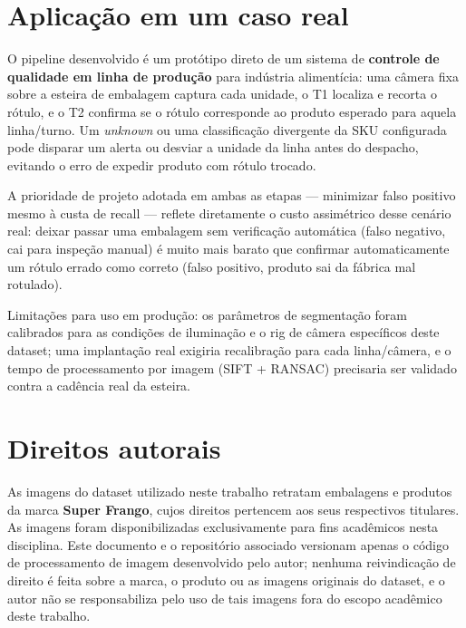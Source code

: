 \documentclass[a4paper,11pt]{article}
\begin{document}
\section{Aplicação em um caso real}

O pipeline desenvolvido é um protótipo direto de um sistema de \textbf{controle de qualidade em
linha de produção} para indústria alimentícia: uma câmera fixa sobre a esteira de embalagem
captura cada unidade, o T1 localiza e recorta o rótulo, e o T2 confirma se o rótulo corresponde
ao produto esperado para aquela linha/turno. Um \emph{unknown} ou uma classificação divergente
da SKU configurada pode disparar um alerta ou desviar a unidade da linha antes do
despacho, evitando o erro de expedir produto com rótulo trocado.

A prioridade de projeto adotada em ambas as etapas --- minimizar falso positivo mesmo à custa de
recall --- reflete diretamente o custo assimétrico desse cenário real: deixar passar uma
embalagem sem verificação automática (falso negativo, cai para inspeção manual) é muito mais
barato que confirmar automaticamente um rótulo errado como correto (falso positivo, produto
sai da fábrica mal rotulado).

Limitações para uso em produção: os parâmetros de segmentação foram calibrados para as condições
de iluminação e o rig de câmera específicos deste dataset; uma implantação real exigiria
recalibração para cada linha/câmera, e o tempo de processamento por imagem (SIFT + RANSAC) precisaria
ser validado contra a cadência real da esteira.

\section{Direitos autorais}

As imagens do dataset utilizado neste trabalho retratam embalagens e produtos da marca
\textbf{Super Frango}, cujos direitos pertencem aos seus respectivos titulares. As imagens foram
disponibilizadas exclusivamente para fins acadêmicos nesta disciplina. Este documento e o
repositório associado versionam apenas o código de processamento de imagem desenvolvido pelo
autor; nenhuma reivindicação de direito é feita sobre a marca, o produto ou as imagens
originais do dataset, e o autor não se responsabiliza pelo uso de tais imagens fora do escopo
acadêmico deste trabalho.
\end{document}

